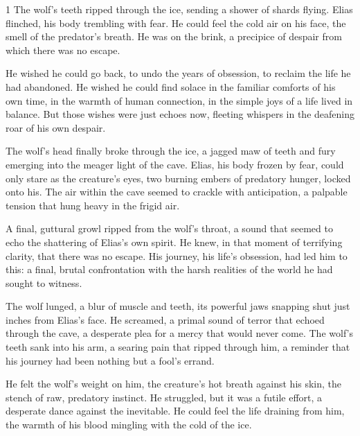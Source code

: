 \documentclass{article}
\newcommand{\Agentsroomzs}{\textsc{Agents' Room$_{ZS}$}}
\begin{document}
\begin{tcolorbox}[colback=white, colframe=gray!30!white, coltitle=black, parskip=5mm, title=
    \textbf{System output: \Agentsroomzs}, breakable]
\begin{spacing}{1}
The wolf's teeth ripped through the ice, sending a shower of shards flying.  Elias flinched, his body trembling with fear.  He could feel the cold air on his face, the smell of the predator's breath.  He was on the brink, a precipice of despair from which there was no escape.\\\par

He wished he could go back, to undo the years of obsession, to reclaim the life he had abandoned.  He wished he could  find solace in the familiar comforts of his own time, in the warmth of human connection, in the simple joys of a life lived in balance.  But those wishes were just echoes now, fleeting whispers in the deafening roar of his own despair.\\\par

The wolf's head finally broke through the ice, a jagged maw of teeth and fury emerging into the meager light of the cave. Elias, his body frozen by fear, could only stare as the creature's eyes, two burning embers of predatory hunger, locked onto his. The air within the cave seemed to crackle with anticipation, a palpable tension that hung heavy in the frigid air.\\\par

A final, guttural growl ripped from the wolf's throat, a sound that seemed to echo the shattering of Elias's own spirit. He knew, in that moment of terrifying clarity, that there was no escape. His journey, his life's obsession, had led him to this: a final, brutal confrontation with the harsh realities of the world he had sought to witness.\\\par

The wolf lunged, a blur of muscle and teeth, its powerful jaws snapping shut just inches from Elias's face. He screamed, a primal sound of terror that echoed through the cave, a desperate plea for a mercy that would never come. The wolf's teeth sank into his arm, a searing pain that ripped through him, a reminder that his journey had been nothing but a fool's errand.\\\par

He felt the wolf's weight on him, the creature's hot breath against his skin, the stench of raw, predatory instinct. He struggled, but it was a futile effort, a desperate dance against the inevitable. He could feel the life draining from him, the warmth of his blood mingling with the cold of the ice.\\\par


\end{spacing}
\end{tcolorbox}
\end{document}
